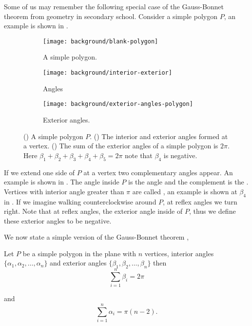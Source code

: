 Some of us may remember the following special case
of the Gauss-Bonnet theorem from geometry in secondary school.
Consider a simple polygon $P$, an example is shown in .

 \begin{figure}[htb]
         \centering
          \begin{subfigure}[b]{0.30\textwidth}
      		   \texttt{[image: background/blank-polygon]}
    		    \caption{A simple polygon.}
 		 \label{fig:polygon}
	 \end{subfigure}
	 \hspace{.5cm}
	 \begin{subfigure}[b]{0.25\textwidth}
       		  \texttt{[image: background/interior-exterior]}
     		    \caption{Angles}
 		 \label{fig:interior-exterior}
       \end{subfigure}
        \hspace{.5cm}
     \begin{subfigure}[b]{0.27\textwidth}
       		  \texttt{[image: background/exterior-angles-polygon]}
       		  \caption{Exterior angles.}
       		   \label{fig:exterior-angles}
         \end{subfigure}
		\caption{() A simple polygon $P.$
		() The interior and exterior angles formed at a vertex.
 		 () The sum of the exterior angles of a simple
		polygon is $2\pi$. Here
		$\beta_1+\beta_2+\beta_3+\beta_4+\beta_5=2\pi$ note that $\beta_4$ is negative.
 		\label{fig:simple-polygon}}
 \end{figure}

If we extend one side of $P$ at a vertex two complementary angles appear.
An example is shown in .
The angle inside $P$ is the  angle and the complement 
is the  . 
Vertices with interior angle greater than $\pi$ are called ,
an example is shown at $\beta_4$ in .
If we imagine walking counterclockwise around $P$, at reflex angles we turn right.
Note that at reflex angles, the exterior angle inside of $P$, thus we define
these exterior angles to be negative. 


We now state a simple version of the Gauss-Bonnet theorem \cite{gottlieb_all_1996,polya_elementary_1954},

\begin{theorem}\label{thm:simple-bonnet}
Let $P$ be a simple polygon in the plane with $n$  vertices,
interior angles $\{\alpha_1,\alpha_2,\ldots,\alpha_n\}$
and exterior angles $\{\beta_1,\beta_2,\ldots,\beta_n\}$ then
\begin{equation}\label{eqn:exterior-sum}
		\sum_{i=1}^n\beta_i=2\pi
\end{equation}

and 
\begin{equation}\label{eqn:interior-sum}
		\sum_{i=1}^n\alpha_i=\pi(n-2).
\end{equation}

\end{theorem}


